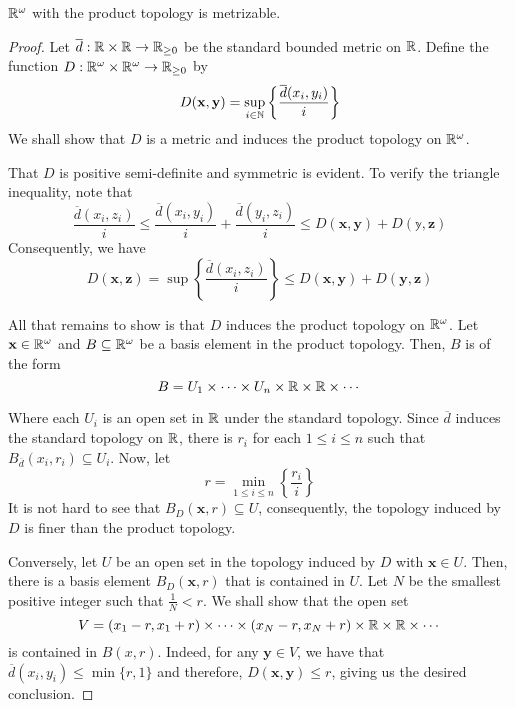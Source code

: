 \begin{theorem}
    $\mathbb{R}^\omega$ with the product topology is metrizable.
\end{theorem}
\begin{proof}
    Let $\overline{d}:\mathbb{R}\times\mathbb{R}\to\mathbb{R}_{\ge0}$ be the standard bounded metric on $\mathbb{R}$. Define the function $D:\mathbb{R}^\omega\times\mathbb{R}^\omega\to\mathbb{R}_{\ge0}$ by 
    \begin{equation*}
        D(\mathbf{x},\mathbf{y}) = \sup_{i\in\mathbb{N}}\left\{\frac{\overline{d}(x_i, y_i)}{i}\right\}
    \end{equation*}
    We shall show that $D$ is a metric and induces the product topology on $\mathbb{R}^\omega$. 

    That $D$ is positive semi-definite and symmetric is evident. To verify the triangle inequality, note that 
    \begin{equation*}
        \frac{\overline{d}(x_i, z_i)}{i}\le\frac{\overline{d}(x_i, y_i)}{i} + \frac{\overline{d}(y_i, z_i)}{i}\le D(\mathbf{x},\mathbf{y}) + D(\mathbb{y},\mathbf{z})
    \end{equation*}
    Consequently, we have 
    \begin{equation*}
        D(\mathbf{x},\mathbf{z}) = \sup\left\{\frac{\overline{d}(x_i,z_i)}{i}\right\}\le D(\mathbf{x},\mathbf{y}) + D(\mathbf{y},\mathbf{z})
    \end{equation*}

    All that remains to show is that $D$ induces the product topology on $\mathbb{R}^\omega$. Let $\mathbf{x}\in\mathbb{R}^\omega$ and $B\subseteq\mathbb{R}^\omega$ be a basis element in the product topology. Then, $B$ is of the form 
    \begin{equation*}
        B = U_1\times\cdots\times U_n\times\mathbb{R}\times\mathbb{R}\times\cdots
    \end{equation*}

    Where each $U_i$ is an open set in $\mathbb{R}$ under the standard topology. Since $\overline{d}$ induces the standard topology on $\mathbb{R}$, there is $r_i$ for each $1\le i\le n$ such that $B_{\overline{d}}(x_i,r_i)\subseteq U_i$. Now, let 
    \begin{equation*}
        r = \min_{1\le i\le n}\left\{\frac{r_i}{i}\right\}
    \end{equation*}
    It is not hard to see that $B_{D}(\mathbf{x}, r)\subseteq U$, consequently, the topology induced by $D$ is finer than the product topology.

    Conversely, let $U$ be an open set in the topology induced by $D$ with $\mathbf{x}\in U$. Then, there is a basis element $B_{D}(\mathbf{x}, r)$ that is contained in $U$. Let $N$ be the smallest positive integer such that $\frac{1}{N} < r$. We shall show that the open set 
    \begin{equation*}
        V = (x_1 - r, x_1 + r)\times\cdots\times(x_N - r, x_N + r)\times\mathbb{R}\times\mathbb{R}\times\cdots
    \end{equation*}
    is contained in $B(x,r)$. Indeed, for any $\mathbf{y}\in V$, we have that $\overline{d}(x_i,y_i)\le\min\{r, 1\}$ and therefore, $D(\mathbf{x},\mathbf{y})\le r$, giving us the desired conclusion.
\end{proof}

